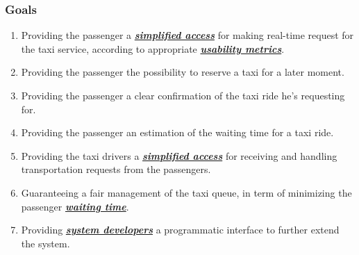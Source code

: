 \documentclass[11pt, a4paper,titlepage]{article}
\begin{document}
\subsubsection{Goals}
	\begin{enumerate}
	\item \label{itm:Goal_PassengerInterface} Providing the passenger a \textit{\textbf{\hyperref[itm:Desc_SimplifiedAccess]{simplified access}}} for making real-time request for the taxi service, according to appropriate \textit{\textbf{\hyperref[itm:Desc_UsabilityMetric]{usability metrics}}}.
	\item \label{itm:Goal_Reservation} Providing the passenger the possibility to reserve a taxi for a later moment.
	\item \label{itm:Goal_Confirmation} Providing the passenger a clear confirmation of the taxi ride he’s requesting for.
	\item \label{itm:Goal_WaitingTime} Providing the passenger an estimation of the waiting time for a taxi ride.
	\item \label{itm:Goal_TaxiInterface} Providing the taxi drivers a \textit{\textbf{\hyperref[itm:Desc_SimplifiedAccess]{simplified access}}} for receiving and handling transportation requests from the passengers.
	\item \label{itm:Goal_FairManagement} Guaranteeing a fair management of the taxi queue, in term of minimizing the passenger \textit{\textbf{\hyperref[itm:Desc_WaitingTime]{waiting time}}}.
	\item \label{itm:Goal_DeveloperInterface} Providing \textit{\textbf{\hyperref[itm:Actor_SysDevs]{system developers}}}  a programmatic interface to further extend the system.
		\end{enumerate}
\end{document}
